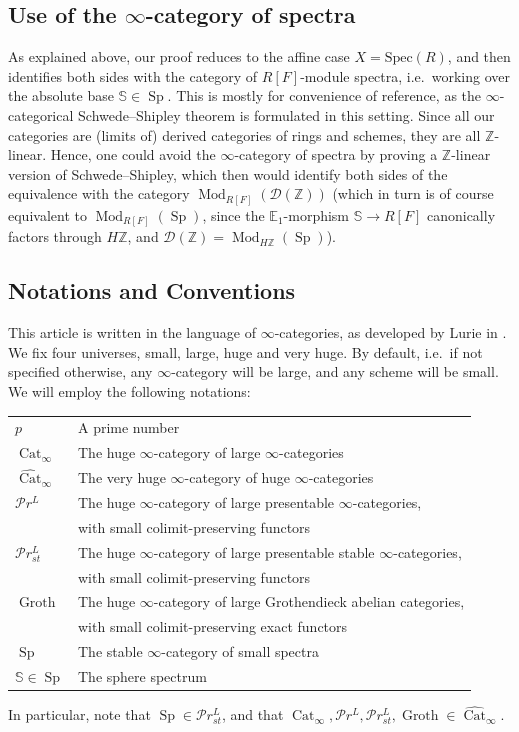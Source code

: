 \documentclass{article}
\theoremstyle{definition}
\theoremstyle{definition}
\theoremstyle{definition}
\theoremstyle{plain}
\theoremstyle{plain}
\theoremstyle{plain}
\theoremstyle{plain}
\theoremstyle{plain}
\theoremstyle{plain}
\theoremstyle{plain}
\theoremstyle{plain}
\theoremstyle{remark}
\theoremstyle{remark}
\theoremstyle{plain}
\theoremstyle{plain}
\theoremstyle{plain}
\theoremstyle{plain}
\theoremstyle{plain}
\newcommand{\Z}{\mathbb{Z}}
\newcommand{\Mod}[1]{\operatorname{Mod}_{#1}}
\newcommand{\Sp}{\operatorname{Sp}}
\renewcommand{\S}{\mathbb{S}}
\newcommand{\Cat}[1]{\mathcal{#1}}
\newcommand{\CatInf}{\operatorname{Cat}_{\infty}}
\newcommand{\CatInfHuge}{\widehat{\operatorname{Cat}}_{\infty}}
\newcommand{\Groth}{\operatorname{Groth}}
\newcommand{\PrL}{\mathcal{P}r^{L}}
\newcommand{\PrSt}{\mathcal{P}r^{L}_{st}}
\begin{document}
\subsection*{Use of the \texorpdfstring{$\infty$}{infinity}-category of spectra}
As explained above, our proof reduces to the affine case $X = \mathrm{Spec}(R)$,
and then identifies both sides with the category of $R[F]$-module spectra,
i.e.\ working over the absolute base $\S \in \Sp$.
This is mostly for convenience of reference, as the $\infty$-categorical Schwede--Shipley 
theorem is formulated in this setting.
Since all our categories are (limits of) derived categories of rings and schemes,
they are all $\Z$-linear. Hence, one could avoid the $\infty$-category of spectra 
by proving a $\Z$-linear version of Schwede--Shipley,
which then would identify both sides of the equivalence with the category 
$\Mod{R[F]}(\Cat D(\Z))$ 
(which in turn is of course equivalent to $\Mod{R[F]}(\Sp)$,
since the $\mathbb{E}_1$-morphism $\S \to R[F]$ canonically factors through $H\Z$,
and $\Cat D(\Z) = \Mod{H\Z}(\Sp)$).

\subsection*{Notations and Conventions}
This article is written in the language of $\infty$-categories, as developed by Lurie in \cite{highertopoi,higheralgebra,sag}.
We fix four universes, small, large, huge and very huge.
By default, i.e.\ if not specified otherwise, any $\infty$-category will be large,
and any scheme will be small. We will employ the following notations:
\begin{table}[H] %
\centering
\begin{tabular}{l|l}
    $p$ &A prime number \\
    $\CatInf$ &The huge $\infty$-category of large $\infty$-categories \\
    $\CatInfHuge$ &The very huge $\infty$-category of huge $\infty$-categories \\
    $\PrL$ &The huge $\infty$-category of large presentable $\infty$-categories, \\& with small colimit-preserving functors \\
    $\PrSt$&The huge $\infty$-category of large presentable stable $\infty$-categories, \\& with small colimit-preserving functors \\
    $\Groth$ & The huge $\infty$-category of large Grothendieck abelian categories, \\& with small colimit-preserving exact functors \\
    $\Sp$ &The stable $\infty$-category of small spectra \\
    $\S \in \Sp$& The sphere spectrum 
\end{tabular}
\end{table}
In particular, note that $\Sp \in \PrSt$,
and that $\CatInf, \PrL, \PrSt, \Groth \in \CatInfHuge$.
\end{document}
